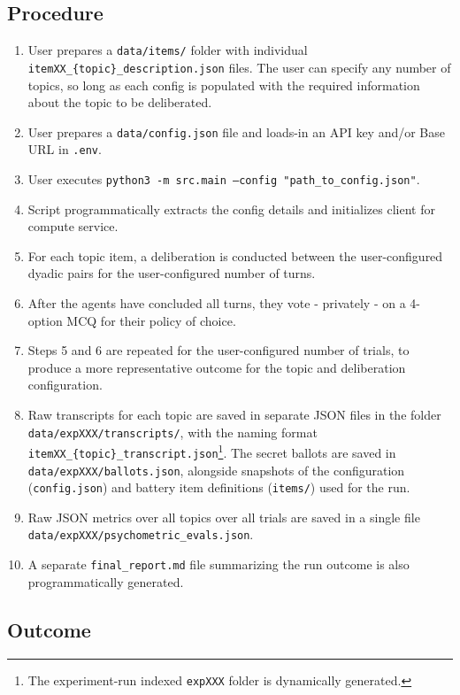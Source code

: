 \documentclass[titlepage]{article}
\begin{document}
\subsection{Procedure}
\begin{enumerate}
    \item User prepares a \texttt{data/items/} folder with individual \texttt{itemXX\_\{topic\}\_description.json} files. The user can specify any number of topics, so long as each config is populated with the required information about the topic to be deliberated.
    \item User prepares a \texttt{data/config.json} file and loads-in an API key and/or Base URL in \texttt{.env}.
    \item User executes \texttt{python3 -m src.main --config "path\_to\_config.json"}.
    \item Script programmatically extracts the config details and initializes client for compute service.
    \item For each topic item, a deliberation is conducted between the user-configured dyadic pairs for the user-configured number of turns.
    \item After the agents have concluded all turns, they vote - privately - on a 4-option MCQ for their policy of choice.
    \item Steps 5 and 6 are repeated for the user-configured number of trials, to produce a more representative outcome for the topic and deliberation configuration.
    \item Raw transcripts for each topic are saved in separate JSON files in the folder \texttt{data/expXXX/transcripts/}, with the naming format \texttt{itemXX\_\{topic\}\_transcript.json}\footnote{The experiment-run indexed \texttt{expXXX} folder is dynamically generated.}. The secret ballots are saved in \texttt{data/expXXX/ballots.json}, alongside snapshots of the configuration (\texttt{config.json}) and battery item definitions (\texttt{items/}) used for the run. 
    \item Raw JSON metrics over all topics over all trials are saved in a single file \texttt{data/expXXX/psychometric\_evals.json}.
    \item A separate \texttt{final\_report.md} file summarizing the run outcome is also programmatically generated. 
\end{enumerate}

\subsection{Outcome}
\end{document}
